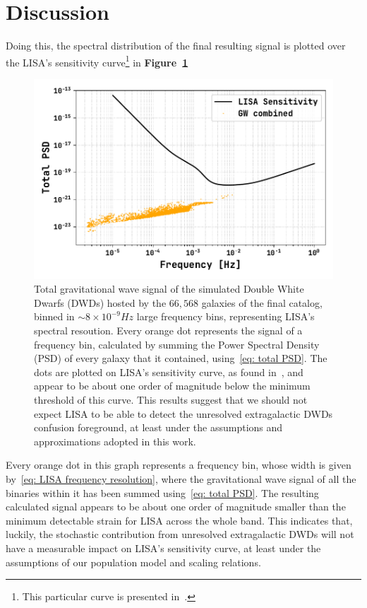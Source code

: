 \section{Discussion}

Doing this, the spectral distribution of the final resulting signal is plotted over the LISA's sensitivity curve\footnote{This particular curve is presented in~\cite{Robson_2019}.} in \textbf{Figure~\ref{fig: Final results plot}}
\begin{figure}[hb!]
    \begin{center}
        \includegraphics[width=\textwidth]{images/Final_results_plot.pdf}
    \end{center}
    \caption{Total gravitational wave signal of the simulated Double White Dwarfs (DWDs) hosted by the $66,568$ galaxies of the final catalog, binned in $\sim 8\times10^{-9}Hz$ large frequency bins, representing LISA's spectral resoution. 
    Every orange dot represents the signal of a frequency bin, calculated by summing the Power Spectral Density (PSD) of every galaxy that it contained, using~\eqref{eq: total PSD}. 
    The dots are plotted on LISA's sensitivity curve, as found in~\cite{Robson_2019}, and appear to be about one order of magnitude below the minimum threshold of this curve.
    This results suggest that we should not expect LISA to be able to detect the unresolved extragalactic DWDs confusion foreground, at least under the assumptions and approximations adopted in this work.}\label{fig: Final results plot}
\end{figure}
Every orange dot in this graph represents a frequency bin, whose width is given by~\eqref{eq: LISA frequency resolution}, where the gravitational wave signal of all the binaries within it has been summed using~\eqref{eq: total PSD}.
The resulting calculated signal appears to be about one order of magnitude smaller than the minimum detectable strain for LISA across the whole band.  
This indicates that, luckily, the stochastic contribution from unresolved extragalactic DWDs will not have a measurable impact on LISA’s sensitivity curve, at least under the assumptions of our population model and scaling relations. 

